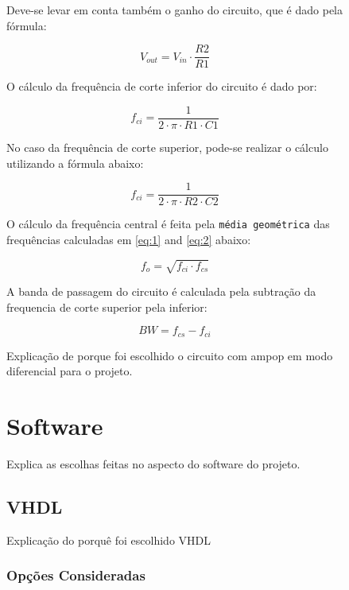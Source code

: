 \begin{table}[h!]
\begin{figure}[htb]
	Deve-se levar em conta também o ganho do circuito, que é dado pela fórmula:
	
	\begin{equation}
		V_{out} = V_{in} \cdot \frac{R2}{R1}
	\end{equation}
	
	O cálculo da frequência de corte inferior do circuito é dado por: 
	
	\begin{equation} \label{eq:1}
		f_{ci} = \frac{1}{2 \cdot \pi \cdot R1 \cdot C1}
	\end{equation}
	
	No caso da frequência de corte superior, pode-se realizar o cálculo utilizando a fórmula abaixo:
	
	\begin{equation} \label{eq:2}
		f_{ci} = \frac{1}{2 \cdot \pi \cdot R2 \cdot C2}
	\end{equation}
	
	O cálculo da frequência central é feita pela \texttt{média geométrica} das frequências calculadas em \ref{eq:1} and \ref{eq:2} abaixo: 
	
	\begin{equation} \label{eq:3}
		f_{o} = \sqrt{f_{ci} \cdot f_{cs}}
	\end{equation}
	
	A banda de passagem do circuito é calculada pela subtração da frequencia de corte superior pela inferior:
	
	\begin{equation} \label{eq:4}
		BW = f_{cs} - f_{ci}
	\end{equation}
	
	Explicação de porque foi escolhido o circuito com ampop em modo diferencial para o projeto.
	
	\section{Software}\label{sec-software}
	
	Explica as escolhas feitas no aspecto do software do projeto.
	
	\subsection{VHDL}\label{soft-vhdl}
	
	Explicação do porquê foi escolhido VHDL
	
	\subsubsection{Opções Consideradas}\label{vhdl-options}
	

\end{figure}
\end{table}
